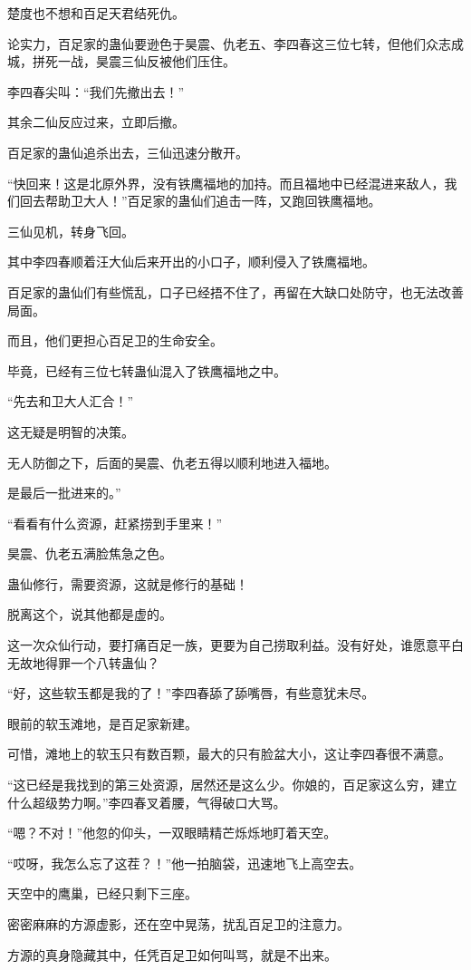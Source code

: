 \begin{this_body}
楚度也不想和百足天君结死仇。

论实力，百足家的蛊仙要逊色于昊震、仇老五、李四春这三位七转，但他们众志成城，拼死一战，昊震三仙反被他们压住。

李四春尖叫：“我们先撤出去！”

其余二仙反应过来，立即后撤。

百足家的蛊仙追杀出去，三仙迅速分散开。

“快回来！这是北原外界，没有铁鹰福地的加持。而且福地中已经混进来敌人，我们回去帮助卫大人！”百足家的蛊仙们追击一阵，又跑回铁鹰福地。

三仙见机，转身飞回。

其中李四春顺着汪大仙后来开出的小口子，顺利侵入了铁鹰福地。

百足家的蛊仙们有些慌乱，口子已经捂不住了，再留在大缺口处防守，也无法改善局面。

而且，他们更担心百足卫的生命安全。

毕竟，已经有三位七转蛊仙混入了铁鹰福地之中。

“先去和卫大人汇合！”

这无疑是明智的决策。

无人防御之下，后面的昊震、仇老五得以顺利地进入福地。

是最后一批进来的。”

“看看有什么资源，赶紧捞到手里来！”

昊震、仇老五满脸焦急之色。

蛊仙修行，需要资源，这就是修行的基础！

脱离这个，说其他都是虚的。

这一次众仙行动，要打痛百足一族，更要为自己捞取利益。没有好处，谁愿意平白无故地得罪一个八转蛊仙？

“好，这些软玉都是我的了！”李四春舔了舔嘴唇，有些意犹未尽。

眼前的软玉滩地，是百足家新建。

可惜，滩地上的软玉只有数百颗，最大的只有脸盆大小，这让李四春很不满意。

“这已经是我找到的第三处资源，居然还是这么少。你娘的，百足家这么穷，建立什么超级势力啊。”李四春叉着腰，气得破口大骂。

“嗯？不对！”他忽的仰头，一双眼睛精芒烁烁地盯着天空。

“哎呀，我怎么忘了这茬？！”他一拍脑袋，迅速地飞上高空去。

天空中的鹰巢，已经只剩下三座。

密密麻麻的方源虚影，还在空中晃荡，扰乱百足卫的注意力。

方源的真身隐藏其中，任凭百足卫如何叫骂，就是不出来。


\end{this_body}
